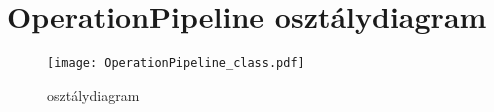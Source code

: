 \section{OperationPipeline osztálydiagram} \label{appendix:op_class_diagram}

\begin{figure}[h]
\texttt{[image: OperationPipeline\_class.pdf]}
\centering
\caption{ osztálydiagram}
\label{fig:op_class_diagram}
\end{figure}




